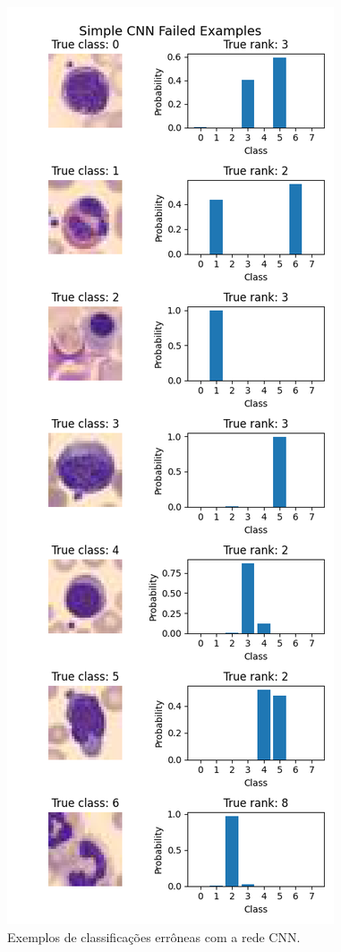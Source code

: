 \documentclass[final,5p]{elsarticle}
\numberwithin{equation}{section}
\begin{document}
        \begin{figure}[H]
            \includegraphics[width=0.8\columnwidth]{CNN_Simple_fails.png}
            \caption{Exemplos de classificações errôneas com a rede CNN.}\label{fig:ErrosCNN}
        \end{figure}
\end{document}
